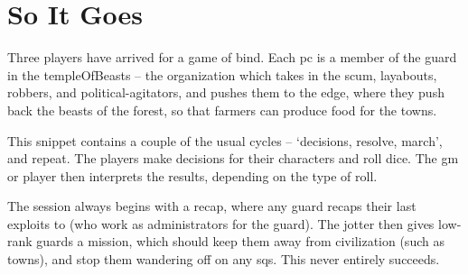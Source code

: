 \section[Example of Play]{So It Goes}

\begin{multicols}{2}

\noindent
Three players have arrived for a game of \gls{bind}.
Each \gls{pc} is a member of the \gls{guard} in the \gls{templeOfBeasts} -- the organization which takes in the scum, layabouts, robbers, and political-agitators, and pushes them to the \gls{edge}, where they push back the beasts of the forest, so that farmers can produce food for the towns.

This snippet contains a couple of the usual cycles -- `decisions, resolve, march', and repeat.
The players make decisions for their characters and roll dice.
The \gls{gm} or player then interprets the results, depending on the type of roll.

The session always begins with a recap, where any \gls{guard} recaps their last exploits to  (who work as administrators for the \gls{guard}).
The \gls{jotter} then gives low-rank \glspl{guard} a mission, which should keep them away from civilization (such as towns), and stop them wandering off on any \glspl{sq}.
This never entirely succeeds.

\end{multicols}
